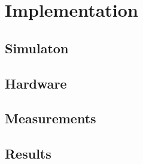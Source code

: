 
\chapter{Implementation}

\section{Simulaton}
\section{Hardware}
\section{Measurements}
\section{Results}
